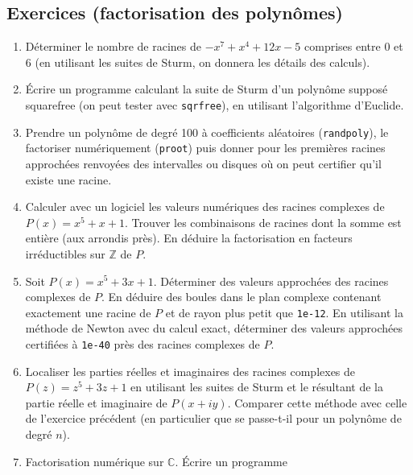 \documentclass[a4paper,11pt]{article}
\newcommand{\C}{{\mathbb{C}}}
\newcommand{\Z}{{\mathbb{Z}}}
\begin{document}
\begin{giacjshere}

\pagebreak

\subsection{Exercices (factorisation des polynômes)}
\begin{enumerate}
\item Déterminer le nombre de racines de $-x^7+x^4+12x-5$ comprises
entre 0 et 6 (en utilisant les suites de Sturm, on donnera les
d\'etails des calculs).
\item \'Ecrire un programme calculant la suite de Sturm d'un polynôme
supposé squarefree (on peut tester avec \verb|sqrfree|), en utilisant
l'algorithme d'Euclide.
\item Prendre un polyn\^ome de degr\'e 100 \`a coefficients
al\'eatoires (\verb|randpoly|), le factoriser num\'eriquement
(\verb|proot|) puis donner pour les premi\`eres racines
approch\'ees renvoy\'ees des intervalles ou disques o\`u
on peut certifier qu'il existe une racine.
\item Calculer avec un logiciel les valeurs numériques des racines
complexes de $P(x)=x^5+x+1$. Trouver les combinaisons de racines
dont la somme est entière (aux arrondis près). En déduire la factorisation
en facteurs irréductibles sur $\Z$ de $P$.
\item Soit $P(x)=x^5+3x+1$. D\'eterminer des valeurs approch\'ees
des racines complexes de $P$. En d\'eduire des boules dans le
plan complexe contenant exactement une racine de $P$ et
de rayon plus petit que \verb|1e-12|. En utilisant la m\'ethode
de Newton avec du calcul exact, d\'eterminer des valeurs approch\'ees
certifi\'ees \`a \verb|1e-40| pr\`es des racines complexes de $P$.
\item Localiser les parties r\'eelles et imaginaires des racines
  complexes de $P(z)=z^5+3z+1$ en utilisant les suites de Sturm
et le r\'esultant de la partie r\'eelle et imaginaire de
$P(x+iy)$. Comparer cette m\'ethode avec celle de l'exercice
pr\'ec\'edent (en particulier que se passe-t-il pour un polyn\^ome
de degr\'e $n$).
\item Factorisation numérique sur $\C$. \'Ecrire un programme

\end{enumerate}
\end{giacjshere}
\end{document}
